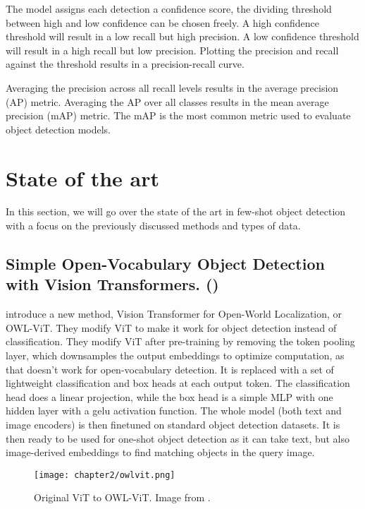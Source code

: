 The model assigns each detection a confidence score, the dividing threshold between high and low confidence can be chosen freely. A high confidence threshold will result in a low recall but high precision. A low confidence threshold will result in a high recall but low precision. Plotting the precision and recall against the threshold results in a precision-recall curve.

Averaging the precision across all recall levels results in the average precision (AP) metric. Averaging the AP over all classes results in the mean average precision (mAP) metric. The mAP is the most common metric used to evaluate object detection models.

\section{State of the art} 
In this section, we will go over the state of the art in few-shot object detection with a focus on the previously discussed methods and types of data.

\subsection*{Simple Open-Vocabulary Object Detection
with Vision Transformers. (\citet{owlvit})} \label{sec:2_owlvit}

\citet{owlvit} introduce a new method, Vision Transformer for Open-World Localization, or OWL-ViT. They modify ViT to make it work for object detection instead of classification. They modify ViT after pre-training by removing the token pooling layer, which downsamples the output embeddings to optimize computation, as that doesn't work for open-vocabulary detection. It is replaced with a set of lightweight classification and box heads at each output token. The classification head does a linear projection, while the box head is a simple MLP with one hidden layer with a gelu activation function. The whole model (both text and image encoders) is then finetuned on standard object detection datasets. It is then ready to be used for one-shot object detection as it can take text, but also image-derived embeddings to find matching objects in the query image.

\begin{figure}[h]
	\centering
	\texttt{[image: chapter2/owlvit.png]}
	\caption{\label{fig:2_owl-vitr} Original ViT to OWL-ViT. Image from \citet{owlvit}.}
\end{figure}

